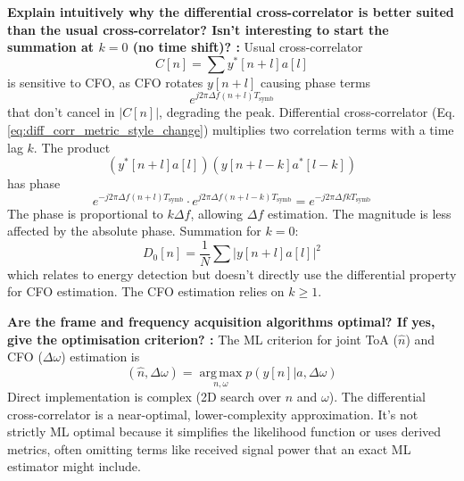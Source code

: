 \documentclass[11pt]{article}
\begin{document}
	\par\noindent\textbf{Explain intuitively why the differential cross-correlator is better suited than the usual cross-correlator? Isn't interesting to start the summation at $k=0$ (no time shift)? :}\quad\ignorespaces 
		Usual cross-correlator 
		\begin{equation} C[n] = \sum y^*[n+l]a[l] \end{equation}
		is sensitive to CFO, as CFO rotates $y[n+l]$ causing phase terms 
		\begin{equation} e^{j2\pi\Delta f (n+l)T_{\text{symb}}} \end{equation}
		that don't cancel in $|C[n]|$, degrading the peak.
		Differential cross-correlator (Eq. \ref{eq:diff_corr_metric_style_change}) multiplies two correlation terms with a time lag $k$. The product 
		\begin{equation} (y^*[n+l]a[l])(y[n+l-k]a^*[l-k]) \end{equation}
		has phase
		\begin{equation} e^{-j2\pi\Delta f(n+l)T_{\text{symb}}} \cdot e^{j2\pi\Delta f(n+l-k)T_{\text{symb}}} = e^{-j2\pi\Delta f k T_{\text{symb}}} \end{equation}
		The phase is proportional to $k\Delta f$, allowing $\Delta f$ estimation. The magnitude is less affected by the absolute phase.
		Summation for $k=0$:
		\begin{equation} D_0[n] = \frac{1}{N}\sum |y[n+l]a[l]|^2 \end{equation}
		which relates to energy detection but doesn't directly use the differential property for CFO estimation. The CFO estimation relies on $k \ge 1$.
	\par
			
	\par\noindent\textbf{Are the frame and frequency acquisition algorithms optimal? If yes, give the optimisation criterion? :}\quad\ignorespaces 
		The ML criterion for joint ToA ($\hat{n}$) and CFO ($\Delta\omega$) estimation is
		\begin{equation} (\hat{n},\Delta\omega)= \operatorname*{arg\,max}_{n,\omega} p(y[n]|a,\Delta\omega) \end{equation}
		Direct implementation is complex (2D search over $n$ and $\omega$). The differential cross-correlator is a near-optimal, lower-complexity approximation. It's not strictly ML optimal because it simplifies the likelihood function or uses derived metrics, often omitting terms like received signal power that an exact ML estimator might include.
	\par
\end{document}
